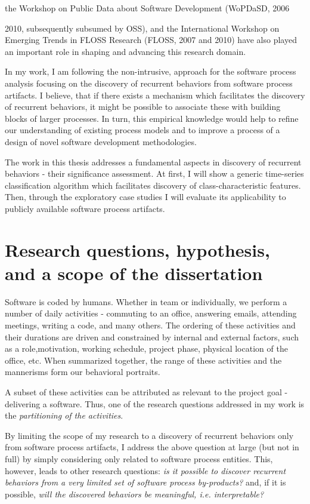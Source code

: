 the Workshop on Public Data about Software Development (WoPDaSD, 2006{2010, subsequently subsumed by OSS), 
and the International Workshop on Emerging Trends in FLOSS Research (FLOSS, 2007 and 2010) have also played
an important role in shaping and advancing this research domain.

In my work, I am following the non-intrusive, approach for the software process analysis focusing on the discovery 
of recurrent behaviors from software process artifacts. I believe, that if there exists a mechanism which facilitates 
the discovery of recurrent behaviors, it might be possible to associate these with building blocks of larger processes. 
In turn, this empirical knowledge would help to refine our understanding of existing process models and to improve 
a process of a design of novel software development methodologies.

The work in this thesis addresses a fundamental aspects in discovery of recurrent behaviors - their significance assessment.
At first, I will show a generic time-series classification algorithm which facilitates discovery of class-characteristic features.
Then, through the exploratory case studies I will evaluate its applicability to publicly available software process artifacts.

\section{Research questions, hypothesis, and a scope of the dissertation}
Software is coded by humans. Whether in team or individually, we perform a number of daily activities - 
commuting to an office, answering emails, attending meetings, writing a code, and many others. 
The ordering of these activities and their durations are driven and constrained by internal and external factors, 
such as a role,motivation, working schedule, project phase, physical location of the office, etc. 
When summarized together, the range of these activities and the mannerisms form our behavioral portraits.

A subset of these activities can be attributed as relevant to the project goal - delivering a software. 
Thus, one of the research questions addressed in my work is the \textit{partitioning of the activities}. 

By limiting the scope of my research to a discovery of recurrent behaviors only from software process 
artifacts, I address the above question at large (but not in full) by simply considering only related to software 
process entities.
This, however, leads to other research questions: 
\textit{is it possible to discover recurrent behaviors from a very limited set of software process by-products?} 
and, if it is possible, 
\textit{will the discovered behaviors be meaningful, i.e. interpretable?}

}
